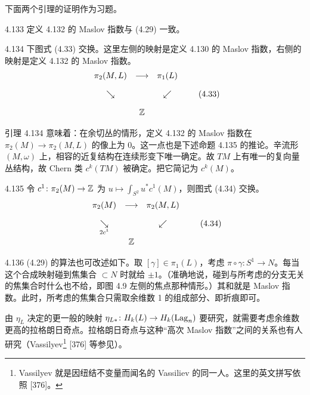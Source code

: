 下面两个引理的证明作为习题。

\begin{lemma}{4.133}
  定义 4.132 的 Maslov 指数与 (4.29) 一致。
\end{lemma}

\begin{lemma}{4.134}
  下图式 (4.33) 交换。这里左侧的映射是定义 4.130 的 Maslov 指数，右侧的映射是定义 4.132 的 Maslov 指数。
  \begin{equation}
    \begin{array}{ccc}
      \pi_2(M,L) & \longrightarrow & \pi_1(L)\\[10pt]
      \searrow & & \swarrow\\[10pt]
      & \mathbb{Z} &
    \end{array}
    \tag{4.33}
  \end{equation}
\end{lemma}

引理 4.134 意味着：在余切丛的情形，定义 4.132 的 Maslov 指数在 $\pi_2(M)\to\pi_2(M,L)$ 的像上为 0。这一点也是下述命题 4.135 的推论。辛流形 $(M,\omega)$ 上，相容的近复结构在连续形变下唯一确定。故 $TM$ 上有唯一的复向量丛结构，故 Chern 类 $c^k(TM)$ 被确定。把它简记为 $c^k(M)$。

\begin{proposition}{4.135}
  令 $c^1\colon\pi_2(M)\to\mathbb{Z}$ 为 $u\mapsto\int_{S^2}u^*c^1(M)$，则图式 (4.34) 交换。
  \begin{equation}
    \begin{array}{ccc}
      \pi_2(M) & \longrightarrow & \pi_2(M,L)\\[10pt]
      \underset{\scriptstyle 2c^1}{\searrow} & & \swarrow\\[10pt]
      & \mathbb{Z} &
    \end{array}
    \tag{4.34}
  \end{equation}
\end{proposition}


\begin{remark}{4.136}
  (4.29) 的算法也可改述如下。取 $[\gamma]\in\pi_1(L)$，考虑 $\pi\circ\gamma\colon S^1\to N$。每当这个合成映射碰到焦集合 $\subset N$ 时就给 $\pm 1$。（准确地说，碰到与所考虑的分支无关的焦集合时什么也不给，即图 4.9 左侧的焦点那种情形。）其和就是 Maslov 指数。此时，所考虑的焦集合只需取余维数 1 的组成部分、即折痕即可。

  由 $\eta_L$ 决定的更一般的映射 $\eta_{L*}\colon H_k(L)\to H_k(\operatorname{Lag}_n)$ 要研究，就需要考虑余维数更高的拉格朗日奇点。拉格朗日奇点与这种“高次 Maslov 指数”之间的关系也有人研究（Vassilyev\footnote{Vassilyev 就是因纽结不变量而闻名的 Vassiliev 的同一人。这里的英文拼写依照 [376]。} [376] 等参见）。
\end{remark}

